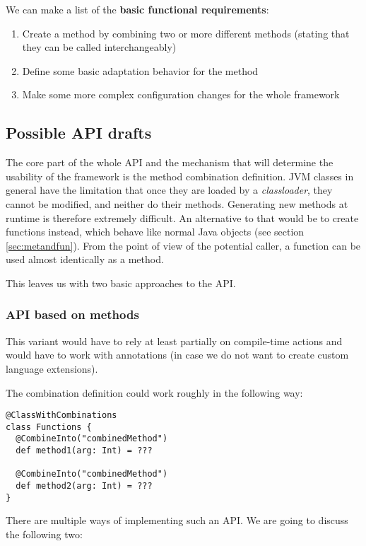 We can make a list of the \textbf{basic functional requirements}:
\begin{enumerate}
	\item Create a method by combining two or more different methods (stating that they can be called interchangeably)
	\item Define some basic adaptation behavior for the method
	\item Make some more complex configuration changes for the whole framework
\end{enumerate}

\subsection{Possible API drafts}
\label{subsec:api_drafts}

The core part of the whole API and the mechanism that will determine the usability of the framework is the method combination definition. JVM classes in general have the limitation that once they are loaded by a \textit{classloader}, they cannot be modified, and neither do their methods. Generating new methods at runtime is therefore extremely difficult. An alternative to that would be to create functions instead, which behave like normal Java objects (see section \ref{sec:metandfun}). From the point of view of the potential caller, a function can be used almost identically as a method. 

This leaves us with two basic approaches to the API.

\subsubsection{API based on methods}

This variant would have to rely at least partially on compile-time actions and would have to work with annotations (in case we do not want to create custom language extensions).

The combination definition could work roughly in the following way:
\lstset{style=Scala}
\begin{lstlisting}
@ClassWithCombinations
class Functions {
  @CombineInto("combinedMethod")
  def method1(arg: Int) = ???
  
  @CombineInto("combinedMethod")
  def method2(arg: Int) = ???
}
\end{lstlisting}

There are multiple ways of implementing such an API. We are going to discuss the following two:

